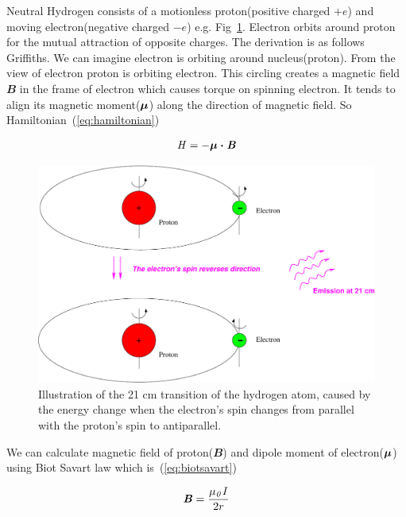 \documentclass[fleqn,usenatbib]{mnras}
\begin{document}
Neutral Hydrogen consists of a motionless proton(positive charged $+e$) and moving electron(negative charged $-e$) e.g. Fig~\ref{fig:hyperfine_figure}. Electron orbits around proton for the mutual attraction of opposite charges. The derivation is as follows Griffiths\citep{griffiths2016introduction}. We can imagine electron is orbiting around nucleus(proton). From the view of electron proton is orbiting electron. This circling creates a magnetic field $\mathbfit{B}$ in the frame of electron which causes torque on spinning electron. It tends to align its magnetic moment($\bmath{\mathit{\umu}}$) along the direction of magnetic field. So Hamiltonian~(\ref{eq:hamiltonian})

\begin{equation}
  \mathit{H}=-\bmath{\mathit{\umu}\cdot\mathit{B}}
  \label{eq:hamiltonian} 
\end{equation}

\begin{figure}
 \includegraphics[width=\columnwidth]{hyperfine}
 \caption{Illustration of the 21 cm transition of the hydrogen atom, caused by the energy change
when the electron's spin changes from parallel with the proton's spin to antiparallel.}
 \label{fig:hyperfine_figure}
\end{figure}  

We can calculate magnetic field of proton($\mathbfit{B}$) and dipole moment of electron($\bmath{\mathit{\umu}}$) using Biot Savart law which is~(\ref{eq:biotsavart})

\begin{equation}
  \textbf{\textit{B}}=\frac{\mathit{\mu_{0}I}}{2r}
  \label{eq:biotsavart}
\end{equation}
\end{document}

